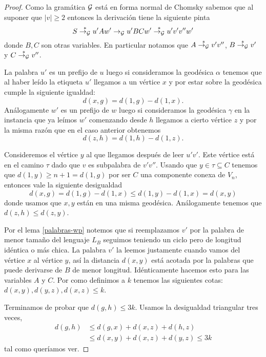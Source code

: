 \documentclass[tesis.tex]{subfiles}
\begin{document}
\begin{proof}
	Como la gramática $ {\cal G} $ está en forma normal de Chomsky sabemos que al suponer que $|v| \ge 2$ entonces la derivación tiene la siguiente pinta
	\begin{equation*}
		S \overset{*}{\to_{\cal G}} u'Aw' \to_{\cal G} u'BC w' \overset{*}{\to_{\cal G}} u'v'v''w'
	\end{equation*}
	donde $B,C$ son otras variables. 
	En particular notamos que $A \overset{*}{\to_{\cal G}} v'v''$, $B \overset{*}{\to_{\cal G}} v'$ y $C \overset{*}{\to_{\cal G}} v''$.
	
	
	La palabra $u'$ es un prefijo de $u$ luego si consideramos la geodésica $\alpha$ tenemos que al haber leído la etiqueta $u'$ llegamos a un vértice $x$ y por estar sobre la geodésica cumple la siguiente igualdad:
	\begin{equation*}
		d(x,g) = d(1,g) - d(1,x).
	\end{equation*}
	Análogamente $w'$ es un prefijo de $w$ luego si consideramos la geodésica $\gamma$ en la instancia que ya leímos $w'$ comenzando desde $h$ llegamos a cierto vértice $z$ y por la misma razón que en el caso anterior obtenemos
	\begin{equation*}
		d(z,h) = d(1,h) - d(1,z).
	\end{equation*}

	Consideremos el vértice $y$ al que llegamos después de leer $u'v'$.
	Este vértice está en el camino $\tau$ dado que $v$ es subpalabra de $v'v''$.
	Usando que $y \in \tau \subseteq C $ tenemos que $d(1,y) \ge n+1 = d(1,g)$ por ser $C$ una componente conexa de $V_n$, entonces vale la siguiente desigualdad
	\begin{equation*}
		d(x,g) = d(1,g) - d(1,x) \le d(1,y) - d(1,x) = d(x,y)
	\end{equation*}
	donde usamos que $x,y$ están en una misma geodésica.
	Análogamente tenemos que $d(z,h) \le d(z,y)$.
	
	
	Por el lema \ref{palabras-wp} notemos que si reemplazamos $v'$ por la palabra de menor tamaño del lenguaje $L_B$ seguimos teniendo un ciclo pero de longitud idéntica o más chica. 
	La palabra $v'$ la leemos justamente cuando vamos del vértice $x$ al vértice $y$, así la distancia  $d(x,y)$ está acotada por la palabras que puede derivarse de $B$ de menor longitud. 
	Idénticamente hacemos esto para las variables $A$ y $C$.
	Por como definimos a $k$ tenemos las siguientes cotas: 
	$d(x,y), d(y,z), d(x,z) \le k$.

	
	Terminamos de probar que $d(g,h) \le 3k$. 
	Usamos la desigualdad triangular tres veces,
	\begin{align*}
		d(g,h) & \le d(g,x) + d(x,z) + d(h,z) \\
		& \le d(x,y) + d(x,z) + d(y,z) \le 3k
	\end{align*}
	tal como queríamos ver.
	
\end{proof}	
\end{document}
